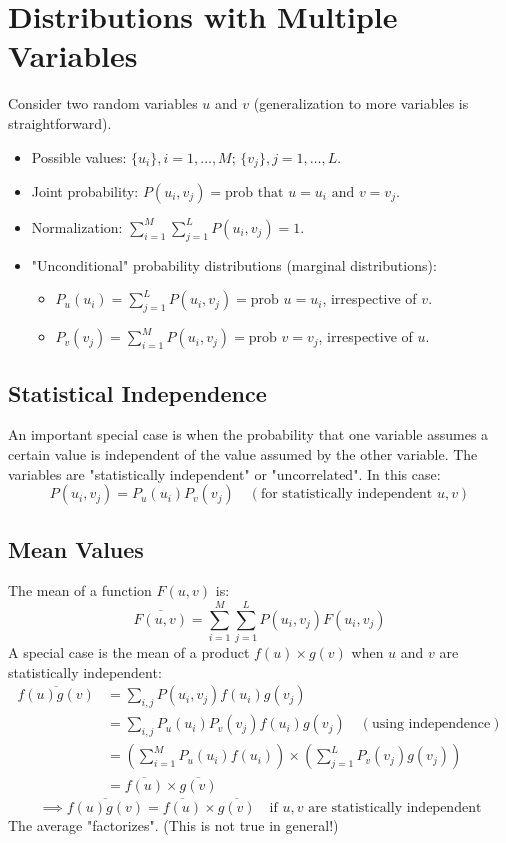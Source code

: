 \documentclass[11pt]{article}
\newcommand{\avg}[1]{\overline{#1}}
\begin{document}
\section*{Distributions with Multiple Variables}

Consider two random variables $u$ and $v$ (generalization to more variables is straightforward).
\begin{itemize}
    \item Possible values: $\{u_i\}, i=1, \dots, M$; $\{v_j\}, j=1, \dots, L$. %
    \item Joint probability: $P(u_i, v_j) = \text{prob that } u=u_i \text{ and } v=v_j$.
    \item Normalization: $\sum_{i=1}^M \sum_{j=1}^L P(u_i, v_j) = 1$.
    \item "Unconditional" probability distributions (marginal distributions):
    \begin{itemize}
        \item $P_u(u_i) = \sum_{j=1}^L P(u_i, v_j) = \text{prob } u=u_i$, irrespective of $v$.
        \item $P_v(v_j) = \sum_{i=1}^M P(u_i, v_j) = \text{prob } v=v_j$, irrespective of $u$.
    \end{itemize}
\end{itemize}

\subsection*{Statistical Independence}
An important special case is when the probability that one variable assumes a certain value is independent of the value assumed by the other variable. The variables are "statistically independent" or "uncorrelated".
In this case:
\[ P(u_i, v_j) = P_u(u_i) P_v(v_j) \quad (\text{for statistically independent } u, v) \]

\subsection*{Mean Values}
The mean of a function $F(u,v)$ is:
\[ \avg{F(u,v)} = \sum_{i=1}^M \sum_{j=1}^L P(u_i, v_j) F(u_i, v_j) \]
A special case is the mean of a product $f(u) \times g(v)$ when $u$ and $v$ are statistically independent:
\begin{align*} \avg{f(u)g(v)} &= \sum_{i,j} P(u_i, v_j) f(u_i) g(v_j) \\ &= \sum_{i,j} P_u(u_i) P_v(v_j) f(u_i) g(v_j) \quad (\text{using independence}) \\ &= \left( \sum_{i=1}^M P_u(u_i) f(u_i) \right) \times \left( \sum_{j=1}^L P_v(v_j) g(v_j) \right) \\ &= \avg{f(u)} \times \avg{g(v)} \end{align*} 
\[ \implies \avg{f(u)g(v)} = \avg{f(u)} \times \avg{g(v)} \quad \text{if } u, v \text{ are statistically independent} \]
The average "factorizes". (This is not true in general!)
\end{document}
